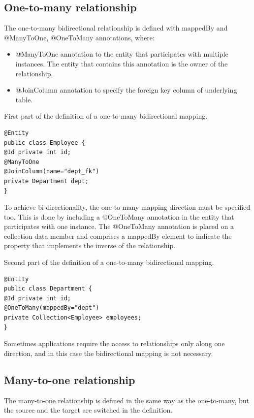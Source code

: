     \subsection*{One-to-many relationship}
    The one-to-many bidirectional relationship is defined with mappedBy and @ManyToOne, @OneToMany annotations, where: 
    \begin{itemize}
        \item @ManyToOne annotation to the entity that participates with multiple instances. The entity that contains this annotation is the owner of the relationship. 
        \item @JoinColumn annotation to specify the foreign key column of underlying table. 
    \end{itemize}
    \begin{example}
        First part of the definition of a one-to-many bidirectional mapping. 
        \begin{lstlisting}[style=Java]
@Entity
public class Employee {
@Id private int id;
@ManyToOne
@JoinColumn(name="dept_fk")
private Department dept;
}
        \end{lstlisting}
    \end{example}
    To achieve bi-directionality, the one-to-many mapping direction must be specified too. This is done by including a @OneToMany annotation in the entity that 
    participates with one instance. The @OneToMany annotation is placed on a collection data member and comprises a mappedBy element to indicate the property that 
    implements the inverse of the relationship.
    \begin{example}
        Second part of the definition of a one-to-many bidirectional mapping. 
        \begin{lstlisting}[style=Java]
@Entity
public class Department {
@Id private int id;
@OneToMany(mappedBy="dept")
private Collection<Employee> employees;
}
        \end{lstlisting}
    \end{example}
    Sometimes applications require the access to relationships only along one direction, and in this case the bidirectional mapping is not necessary. 
    
    \subsection*{Many-to-one relationship}
    The many-to-one relationship is defined in the same way as the one-to-many, but the source and the target are switched in the definition. 

